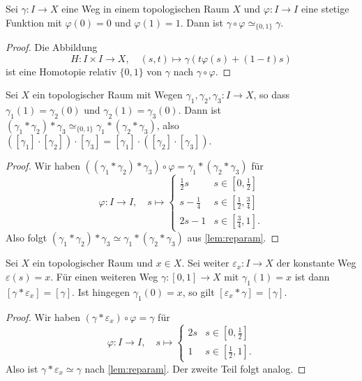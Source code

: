 \begin{lemma}\label{lem:reparam}
Sei $\gamma\colon I\to X$ eine Weg in einem topologischen Raum $X$ und $\varphi\colon I\to I$ eine stetige Funktion mit $\varphi(0) = 0$ und $\varphi(1) = 1$. Dann ist $\gamma\circ\varphi\simeq_{\{0,1\}}\gamma$.
\end{lemma}
\begin{proof}
Die Abbildung
\[
H\colon I\times I\to X,\quad (s,t)\mapsto \gamma(t\varphi(s) + (1-t)s)
\]
ist eine Homotopie relativ $\{0,1\}$ von $\gamma$ nach $\gamma\circ\varphi$.
\end{proof}

\begin{lemma}\label{lem:path-assoc}
Sei $X$ ein topologischer Raum mit Wegen $\gamma_1,\gamma_2,\gamma_3\colon I\to X$, so dass $\gamma_1(1) = \gamma_2(0)$ und $\gamma_2(1) = \gamma_3(0)$. Dann ist $(\gamma_1*\gamma_2)*\gamma_3 \simeq_{\{0,1\}} \gamma_1*(\gamma_2*\gamma_3)$, also $([\gamma_1]\cdot[\gamma_2])\cdot[\gamma_3] = [\gamma_1]\cdot([\gamma_2]\cdot[\gamma_3])$.
\end{lemma}
\begin{proof}
Wir haben $((\gamma_1*\gamma_2)*\gamma_3)\circ\varphi = \gamma_1*(\gamma_2*\gamma_3)$ für
\[
\varphi\colon I\to I,\quad s\mapsto\begin{cases}
\tfrac12 s & s\in[0,\tfrac12] \\
s - \tfrac14 & s\in[\tfrac12,\tfrac34] \\
2s - 1 & s\in[\tfrac34, 1].
\end{cases}
\]
Also folgt $(\gamma_1*\gamma_2)*\gamma_3\simeq\gamma_1*(\gamma_2*\gamma_3)$ aus \autoref{lem:reparam}.
\end{proof}

\begin{lemma}\label{lem:path-neutral}
Sei $X$ ein topologischer Raum und $x\in X$. Sei weiter $\varepsilon_x\colon I\to X$ der konstante Weg $\varepsilon(s) = x$. Für einen weiteren Weg $\gamma\colon[0,1]\to X$ mit $\gamma_1(1) = x$ ist dann $[\gamma*\varepsilon_x] = [\gamma]$. Ist hingegen $\gamma_1(0) = x$, so gilt $[\varepsilon_x*\gamma] = [\gamma]$.
\end{lemma}
\begin{proof}
Wir haben $(\gamma*\varepsilon_x)\circ\varphi = \gamma$ für
\[
\varphi\colon I\to I,\quad s\mapsto\begin{cases}
2s & s\in[0,\tfrac12] \\
1 & s\in[\tfrac12,1].
\end{cases}
\]
Also ist $\gamma*\varepsilon_x\simeq\gamma$ nach \autoref{lem:reparam}. Der zweite Teil folgt analog.
\end{proof}

